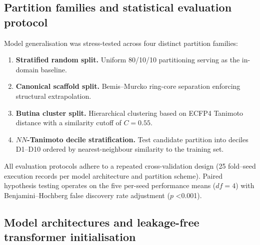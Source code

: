 \documentclass[11pt,a4paper]{article}
\begin{document}
\subsection{Partition families and statistical evaluation protocol}

Model generalisation was stress-tested across four distinct partition families:
\begin{enumerate}[leftmargin=*]
    \item \textbf{Stratified random split.} Uniform \num{80}/\num{10}/\num{10} partitioning serving as the in-domain baseline.
    \item \textbf{Canonical scaffold split.} Bemis--Murcko ring-core separation \citep{bemis_murcko_1996} enforcing structural extrapolation.
    \item \textbf{Butina cluster split.} Hierarchical clustering based on ECFP4 Tanimoto distance with a similarity cutoff of $C=\num{0.55}$.
    \item \textbf{$NN$-Tanimoto decile stratification.} Test candidate partition into deciles D1--D10 ordered by nearest-neighbour similarity to the training set.
\end{enumerate}
All evaluation protocols adhere to a repeated  cross-validation design (\num{25} fold--seed execution records per model architecture and partition scheme). Paired hypothesis testing operates on the five per-seed performance means ($df=\num{4}$) with Benjamini--Hochberg false discovery rate adjustment ($p$ \num{<0.001}).

\subsection{Model architectures and leakage-free transformer initialisation}
\end{document}
